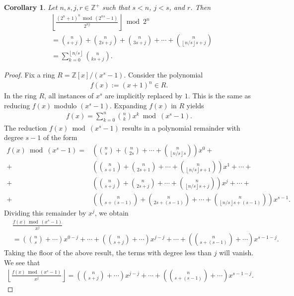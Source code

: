 \documentclass[10pt]{article}
\theoremstyle{plain}
\newtheorem{corollary}{Corollary}[section]
\newcommand{\floor}[1]{\left\lfloor #1 \right\rfloor}
\newcommand{\Z}{\mathbb{Z}}
\begin{document}
\begin{corollary}
Let $n,s,j,r \in \Z^+$ such that $s < n$, $j < s$, and $r $. Then
\begin{align*}
& \floor{\frac{(2^n+1)^n \bmod (2^{ns}-1)}{2^{nj}}} \bmod 2^n \\
&= \binom{n}{s+j} + \binom{n}{2s+j} + \binom{n}{3s+j} + \cdots + \binom{n}{\floor{n/s}s+j} \\
&= \sum_{k=0}^{\floor{n/s}} \binom{n}{ks+j} .
\end{align*}
\end{corollary}
\begin{proof}
Fix a ring $R = \Z[x]/(x^s-1)$. Consider the polynomial
\begin{align*}
f(x) := (x+1)^n \in R .
\end{align*}
In the ring $R$, all instances of $x^s$ are implicitly replaced by $1$. This is the same as reducing $f(x)$ modulo $(x^s-1)$. Expanding $f(x)$ in $R$ yields
\begin{align*}
f(x) = \sum_{k=0}^n \binom{n}{k} x^k \bmod(x^s-1) .
\end{align*}
The reduction $f(x) \bmod (x^s-1)$ results in a polynomial remainder with degree $s-1$ of the form
\begin{align*}
f(x) \bmod (x^s-1) = & \left(\binom{n}{s} + \binom{n}{2s} + \cdots + \binom{n}{\floor{n/s}s} \right) x^0 + \\
+ & \left(\binom{n}{s+1} + \binom{n}{2s+1} + \cdots + \binom{n}{\floor{n/s}s+1} \right) x^1 + \cdots + \\
+ & \left(\binom{n}{s+j} + \binom{n}{2s+j} + \cdots + \binom{n}{\floor{n/s}s+j} \right) x^j
+ \cdots + \\
+ & \left(\binom{n}{s+(s-1)} + \binom{n}{2s+(s-1)} + \cdots + \binom{n}{\floor{n/s}s+(s-1)} \right) x^{s-1} .
\end{align*}
Dividing this remainder by $x^j$, we obtain
\begin{align*}
& \frac{f(x) \bmod(x^s-1)}{x^j} \\
&= \left(\binom{n}{s} + \cdots \right) x^{0-j}
+ \cdots
+ \left(\binom{n}{s+j} + \cdots \right) x^{j-j}
+ \cdots
+ \left(\binom{n}{s+(s-1)} + \cdots \right) x^{s-1-j} .
\end{align*}
Taking the floor of the above result, the terms with degree less than $j$ will vanish. We see that
\begin{align*}
\floor{\frac{f(x) \bmod(x^s-1)}{x^j}}
= \left(\binom{n}{s+j} + \cdots \right) x^{j-j}
+ \cdots
+ \left(\binom{n}{s+(s-1)} + \cdots \right) x^{s-1-j} .
\end{align*}

\end{proof}
\end{document}
